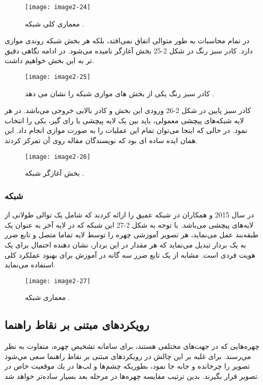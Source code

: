 \begin{figure}[h]
\centering
  \texttt{[image: image2-24]}
  \caption{معماری کلی شبکه  \cite{ref1}.}
  \label{image2-24}
\end{figure}

\noindent
در  تمام محاسبات به طور متوالی اتفاق نمی‌افتد، بلکه هر بخش شبکه روندی موازی دارد. کادر سبز رنگ در شکل 2-25 بخش آغازگر نامیده می‌شود. در ادامه نگاهی دقیق تر به این بخش خواهیم داشت.
 
\begin{figure}[h]
\centering
  \texttt{[image: image2-25]}
  \caption{کادر سبز رنگ یکی از بخش های موازی شبکه را نشان می دهد \cite{ref1}.}
  \label{image2-25}
\end{figure}

\noindent
کادر سبز پایین در شکل 2-26 ورودی این بخش و کادر بالایی خروجی می‌باشد. در هر لایه شبکه‌های پیچشی معمولی، باید بین یک لایه پیچشی یا رای گیر، یکی را انتخاب نمود. در حالی که اینجا می‌توان تمام این عملیات را به صورت موازی انجام داد. این همان ایده ساده ای بود که نویسندگان مقاله روی آن تمرکز کردند.
 
\begin{figure}[h]
\centering
  \texttt{[image: image2-26]}
  \caption{بخش آغازگر شبکه  \cite{ref1}.}
  \label{image2-26}
\end{figure}

\subsubsection{	شبکه }
در سال 2015  و همکاران در \cite{parkhi2015deep} شبکه عمیق  را ارائه کردند که شامل یک توالی طولانی از لایه‌های پیچشی می‌باشد. با توجه به شکل 2-27 این شبکه که در لایه آخر به عنوان یک طبقه‌بند عمل می‌نماید، هر تصویر آموزشی چهره را توسط لایه تماما متصل و تابع ضرر  به یک بردار تبدیل می‌نماید که هر مقدار در این بردار، نشان دهنده احتمال برای یک هویت فردی است.  مشابه  از یک تابع ضرر سه گانه  در آموزش برای بهبود عملکرد کلی استفاده می‌نماید.
 
 \begin{figure}[h]
\centering
  \texttt{[image: image2-27]}
  \caption{معماری شبکه  \cite{ref1}.}
  \label{image2-27}
\end{figure}

 \subsection{رویکردهای مبتنی بر نقاط راهنما} 
چهره‌هايى كه در جهت‌هاى مختلفى هستند، براى سامانه تشخیص چهره، متفاوت به نظر مي‌رسند. براى غلبه بر اين چالش در رویکردهای مبتنی بر نقاط راهنما سعى مي‌شود تصوير را چرخانده و جابه جا نمود، بطوريكه چشم‌ها و لب‌ها در يك موقعيت خاص در تصوير قرار بگیرند. بدین ترتیب مقايسه چهره‌ها در مرحله بعد بسيار ساده‌تر خواهد شد.

